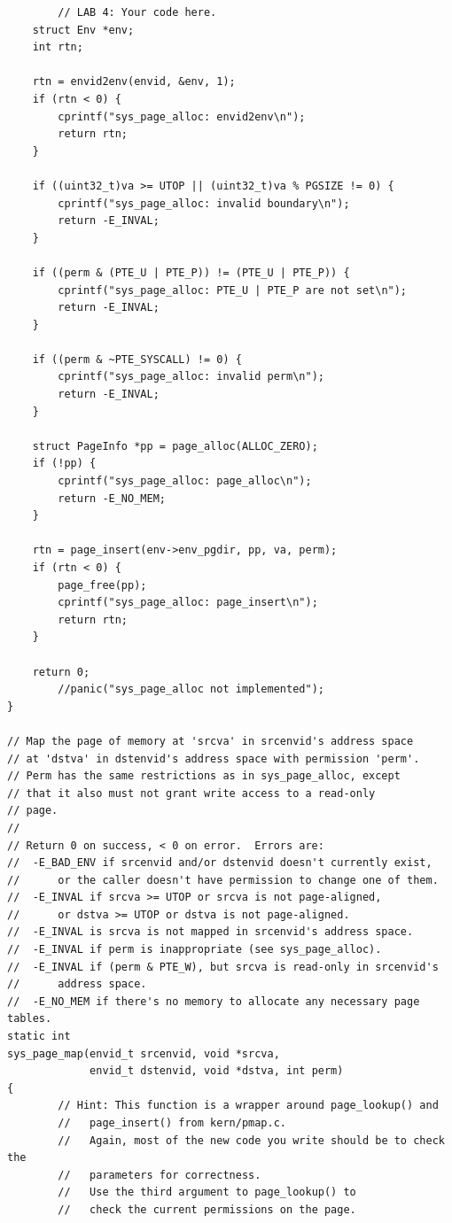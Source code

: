 \begin{ExerciseList}
\begin{verbatim}
        // LAB 4: Your code here.
    struct Env *env;
    int rtn;

    rtn = envid2env(envid, &env, 1);
    if (rtn < 0) {
        cprintf("sys_page_alloc: envid2env\n");
        return rtn;
    }

    if ((uint32_t)va >= UTOP || (uint32_t)va % PGSIZE != 0) {
        cprintf("sys_page_alloc: invalid boundary\n");
        return -E_INVAL;
    }

    if ((perm & (PTE_U | PTE_P)) != (PTE_U | PTE_P)) {
        cprintf("sys_page_alloc: PTE_U | PTE_P are not set\n");
        return -E_INVAL;
    }

    if ((perm & ~PTE_SYSCALL) != 0) {
        cprintf("sys_page_alloc: invalid perm\n");
        return -E_INVAL;
    }

    struct PageInfo *pp = page_alloc(ALLOC_ZERO);
    if (!pp) {
        cprintf("sys_page_alloc: page_alloc\n");
        return -E_NO_MEM;
    }

    rtn = page_insert(env->env_pgdir, pp, va, perm);
    if (rtn < 0) {
        page_free(pp);
        cprintf("sys_page_alloc: page_insert\n");
        return rtn;
    }

    return 0;
        //panic("sys_page_alloc not implemented");
}

// Map the page of memory at 'srcva' in srcenvid's address space
// at 'dstva' in dstenvid's address space with permission 'perm'.
// Perm has the same restrictions as in sys_page_alloc, except
// that it also must not grant write access to a read-only
// page.
//
// Return 0 on success, < 0 on error.  Errors are:
//	-E_BAD_ENV if srcenvid and/or dstenvid doesn't currently exist,
//		or the caller doesn't have permission to change one of them.
//	-E_INVAL if srcva >= UTOP or srcva is not page-aligned,
//		or dstva >= UTOP or dstva is not page-aligned.
//	-E_INVAL is srcva is not mapped in srcenvid's address space.
//	-E_INVAL if perm is inappropriate (see sys_page_alloc).
//	-E_INVAL if (perm & PTE_W), but srcva is read-only in srcenvid's
//		address space.
//	-E_NO_MEM if there's no memory to allocate any necessary page tables.
static int
sys_page_map(envid_t srcenvid, void *srcva,
             envid_t dstenvid, void *dstva, int perm)
{
        // Hint: This function is a wrapper around page_lookup() and
        //   page_insert() from kern/pmap.c.
        //   Again, most of the new code you write should be to check the
        //   parameters for correctness.
        //   Use the third argument to page_lookup() to
        //   check the current permissions on the page.


\end{verbatim}
\end{ExerciseList}
